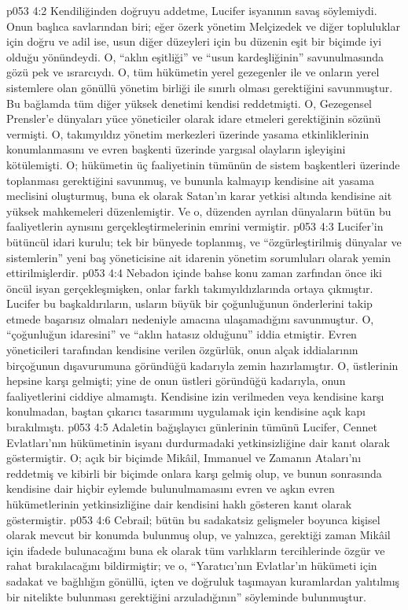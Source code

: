 \vs p053 4:2 Kendiliğinden doğruyu addetme, Lucifer isyanının savaş söylemiydi. Onun başlıca savlarından biri; eğer özerk yönetim Melçizedek ve diğer topluluklar için doğru ve adil ise, usun diğer düzeyleri için bu düzenin eşit bir biçimde iyi olduğu yönündeydi. O, “aklın eşitliği” ve “usun kardeşliğinin” savunulmasında gözü pek ve ısrarcıydı. O, tüm hükümetin yerel gezegenler ile ve onların yerel sistemlere olan gönüllü yönetim birliği ile sınırlı olması gerektiğini savunmuştur. Bu bağlamda tüm diğer yüksek denetimi kendisi reddetmişti. O, Gezegensel Prensler’e dünyaları yüce yöneticiler olarak idare etmeleri gerektiğinin sözünü vermişti. O, takımyıldız yönetim merkezleri üzerinde yasama etkinliklerinin konumlanmasını ve evren başkenti üzerinde yargısal olayların işleyişini kötülemişti. O; hükümetin üç faaliyetinin tümünün de sistem başkentleri üzerinde toplanması gerektiğini savunmuş, ve bununla kalmayıp kendisine ait yasama meclisini oluşturmuş, buna ek olarak Satan’ın karar yetkisi altında kendisine ait yüksek mahkemeleri düzenlemiştir. Ve o, düzenden ayrılan dünyaların bütün bu faaliyetlerin aynısını gerçekleştirmelerinin emrini vermiştir.
\vs p053 4:3 Lucifer’in bütüncül idari kurulu; tek bir bünyede toplanmış, ve “özgürleştirilmiş dünyalar ve sistemlerin” yeni baş yöneticisine ait idarenin yönetim sorumluları olarak yemin ettirilmişlerdir.
\vs p053 4:4 Nebadon içinde bahse konu zaman zarfından önce iki öncül isyan gerçekleşmişken, onlar farklı takımyıldızlarında ortaya çıkmıştır. Lucifer bu başkaldırıların, usların büyük bir çoğunluğunun önderlerini takip etmede başarısız olmaları nedeniyle amacına ulaşamadığını savunmuştur. O, “çoğunluğun idaresini” ve “aklın hatasız olduğunu” iddia etmiştir. Evren yöneticileri tarafından kendisine verilen özgürlük, onun alçak iddialarının birçoğunun dışavurumuna göründüğü kadarıyla zemin hazırlamıştır. O, üstlerinin hepsine karşı gelmişti; yine de onun üstleri göründüğü kadarıyla, onun faaliyetlerini ciddiye almamıştı. Kendisine izin verilmeden veya kendisine karşı konulmadan, baştan çıkarıcı tasarımını uygulamak için kendisine açık kapı bırakılmıştı.
\vs p053 4:5 Adaletin bağışlayıcı günlerinin tümünü Lucifer, Cennet Evlatları’nın hükümetinin isyanı durdurmadaki yetkinsizliğine dair kanıt olarak göstermiştir. O; açık bir biçimde Mikâil, Immanuel ve Zamanın Ataları’nı reddetmiş ve kibirli bir biçimde onlara karşı gelmiş olup, ve bunun sonrasında kendisine dair hiçbir eylemde bulunulmamasını evren ve aşkın evren hükümetlerinin yetkinsizliğine dair kendisini haklı gösteren kanıt olarak göstermiştir.
\vs p053 4:6 Cebrail; bütün bu sadakatsiz gelişmeler boyunca kişisel olarak mevcut bir konumda bulunmuş olup, ve yalnızca, gerektiği zaman Mikâil için ifadede bulunacağını buna ek olarak tüm varlıkların tercihlerinde özgür ve rahat bırakılacağını bildirmiştir; ve o, “Yaratıcı’nın Evlatlar’ın hükümeti için sadakat ve bağlılığın gönüllü, içten ve doğruluk taşımayan kuramlardan yalıtılmış bir nitelikte bulunması gerektiğini arzuladığının” söyleminde bulunmuştur.
